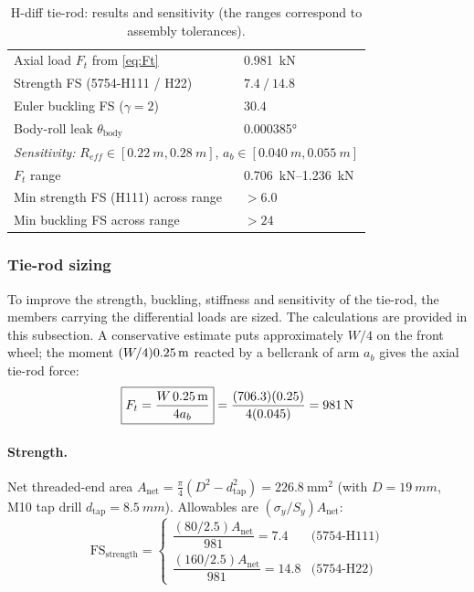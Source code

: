 \documentclass[letterpaper, 10 pt, conference]{ieeeconf}  %
\begin{document}
\begin{table}[htbp]
\caption{H-diff tie-rod: results and sensitivity (the ranges correspond to assembly tolerances).}
\label{tab:tierod}
\centering
\footnotesize
\begin{tabular}{p{} >{\raggedleft\arraybackslash}p{}}
\hline
Axial load $F_t$ from \eqref{eq:Ft} & \SI{0.981}{kN} \\
Strength FS (5754-H111 / H22) & $7.4\ / \ 14.8$ \\
Euler buckling FS ($\gamma\!=\!2$) & $30.4$ \\
Body-roll leak $\theta_{\mathrm{body}}$ & \ang{0.000385} \\
\hline
\multicolumn{2}{p{\dimexpr0.94\columnwidth}}{\textit{Sensitivity:} $R_{\!eff}\in[\SI{0.22}{m},\SI{0.28}{m}]$, $a_b\in[\SI{0.040}{m},\SI{0.055}{m}]$} \\
$F_t$ range & \SIrange{0.706}{1.236}{kN} \\
Min strength FS (H111) across range & $>6.0$ \\
Min buckling FS across range & $>24$ \\
\hline
\end{tabular}
\end{table}


\subsubsection{Tie-rod sizing}
To improve the strength, buckling, stiffness and sensitivity of the tie-rod, the members carrying the differential loads are sized. The calculations are provided in this subsection. A conservative estimate puts approximately \(W/4\) on the front wheel; the moment \((W/4)\SI{0.25}{\meter}\) reacted by a bellcrank of arm \(a_b\) gives the axial tie-rod force: 
\begin{equation}
\boxed{F_t=\dfrac{W\,\SI{0.25}{\meter}}{4a_b}}
=\frac{(706.3)(0.25)}{4(0.045)}=\SI{981}{\newton}
\label{eq:Ft}
\end{equation}

\paragraph*{Strength.}
Net threaded-end area \(A_{\text{net}}=\tfrac{\pi}{4}(D^2-d_{\mathrm{tap}}^2)=\SI{226.8}{\milli\meter^2}\) (with \(D=\SI{19}{mm}\), M10 tap drill \(d_{\mathrm{tap}}=\SI{8.5}{mm}\)).
Allowables are \((\sigma_y/S_y)A_{\text{net}}\):
\[
\text{FS}_{\text{strength}}=
\begin{cases}
\dfrac{(80/2.5)A_{\text{net}}}{981}=\mathbf{7.4} & \text{(5754-H111)}\\[4pt]
\dfrac{(160/2.5)A_{\text{net}}}{981}=\mathbf{14.8} & \text{(5754-H22)}
\end{cases}
\]
\end{document}
